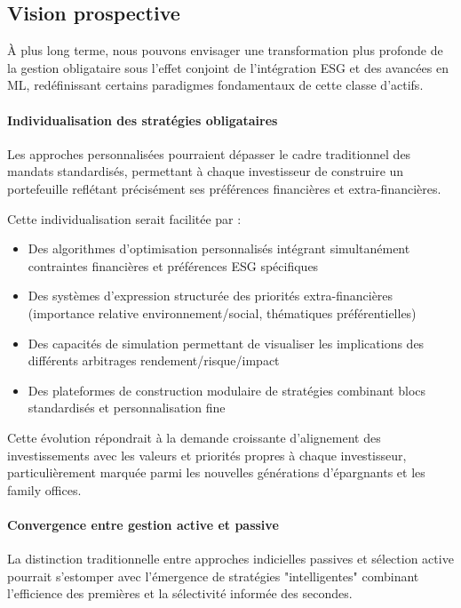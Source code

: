 \subsection*{Vision prospective}

À plus long terme, nous pouvons envisager une transformation plus profonde de la gestion obligataire sous l'effet conjoint de l'intégration ESG et des avancées en ML, redéfinissant certains paradigmes fondamentaux de cette classe d'actifs.

\paragraph{Individualisation des stratégies obligataires} 

Les approches personnalisées pourraient dépasser le cadre traditionnel des mandats standardisés, permettant à chaque investisseur de construire un portefeuille reflétant précisément ses préférences financières et extra-financières.

Cette individualisation serait facilitée par :
\begin{itemize}
    \item Des algorithmes d'optimisation personnalisés intégrant simultanément contraintes financières et préférences ESG spécifiques
    \item Des systèmes d'expression structurée des priorités extra-financières (importance relative environnement/social, thématiques préférentielles)
    \item Des capacités de simulation permettant de visualiser les implications des différents arbitrages rendement/risque/impact
    \item Des plateformes de construction modulaire de stratégies combinant blocs standardisés et personnalisation fine
\end{itemize}

Cette évolution répondrait à la demande croissante d'alignement des investissements avec les valeurs et priorités propres à chaque investisseur, particulièrement marquée parmi les nouvelles générations d'épargnants et les family offices.

\paragraph{Convergence entre gestion active et passive} 

La distinction traditionnelle entre approches indicielles passives et sélection active pourrait s'estomper avec l'émergence de stratégies "intelligentes" combinant l'efficience des premières et la sélectivité informée des secondes.

